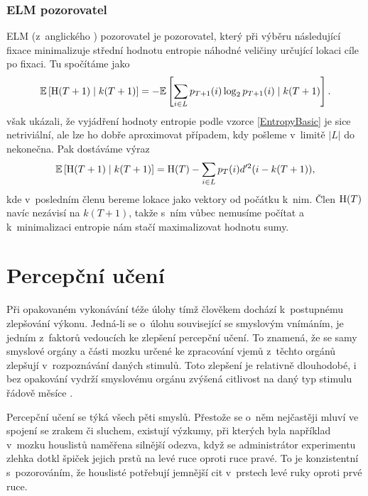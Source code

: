 \subsubsection{ELM pozorovatel}

ELM (z~anglického ) pozorovatel je
pozorovatel, který při výběru následující fixace minimalizuje střední hodnotu
entropie náhodné veličiny určující lokaci cíle po fixaci. Tu spočítáme jako
\begin{equation}\label{EntropyBasic}\mathbb{E}\left[\operatorname{H}(T+1)\mid k(T+1)\right]=-\mathbb{E}\left[\displaystyle\sum_{i\in
L}p_{T+1}(i)\log_2p_{T+1}(i)\mid k(T+1)\right].\end{equation} \citet{Najemnik09} však ukázali,
že vyjádření hodnoty entropie podle vzorce \eqref{EntropyBasic} je sice
netriviální, ale lze ho dobře aproximovat případem, kdy pošleme v~limitě $|L|$
do nekonečna. Pak dostáváme výraz $$ \mathbb{E}\left[\operatorname{H}(T+1)\mid k(T+1)\right]= \operatorname{H}(T) -
\displaystyle\sum_{i\in L} p_T(i)d'^2(i-k(T+1)),$$ kde v~posledním členu bereme
lokace jako vektory od počátku k~nim. Člen $\operatorname{H}(T)$ navíc nezávisí na $k(T+1)$,
takže s~ním vůbec nemusíme počítat a k~minimalizaci entropie nám stačí
maximalizovat hodnotu sumy.


\section{Percepční učení}

Při opakovaném vykonávání téže úlohy tímž člověkem dochází k~postupnému
zlepšování výkonu. Jedná-li se o~úlohu související se smyslovým vnímáním, je
jedním z~faktorů vedoucích ke zlepšení percepční učení. To znamená, že se samy
smyslové orgány a části mozku určené ke zpracování vjemů z~těchto orgánů
zlepšují v~rozpoznávání daných stimulů. Toto zlepšení je relativně dlouhodobé,
i bez opakování vydrží smyslovému orgánu zvýšená citlivost na daný typ stimulu
řádově měsíce \citep{uceni2}.

Percepční učení se týká všech pěti smyslů. Přestože se o~něm nejčastěji mluví
ve spojení se zrakem či sluchem, existují výzkumy, při kterých byla například v~mozku
houslistů naměřena silnější odezva, když se administrátor experimentu zlehka dotkl
špiček jejich prstů na levé ruce oproti ruce pravé. To je konzistentní s~pozorováním,
že houslisté potřebují jemnější cit v~prstech levé ruky oproti prvé ruce.

